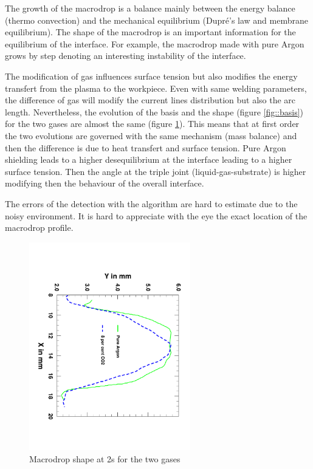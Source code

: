 \documentclass[12pt]{iopart}
\begin{document}
 The growth of the macrodrop is a balance mainly between
the energy balance (thermo convection) and the mechanical equilibrium (Dupr\'e's law and membrane equilibrium). 
The shape of the macrodrop is an important information for
the equilibrium of the interface. 
For example, the macrodrop made with  pure Argon grows by step denoting an interesting instability 
of the interface. 

The modification of gas influences surface tension but also modifies the energy transfert from the plasma
to the workpiece. Even with same welding parameters, 
the difference of gas will modify the current lines distribution but also the arc length.
Nevertheless, the evolution of the basis and the  shape 
(figure \ref{fig::basis}) for the two gases are almost the same (figure \ref{fig::comp_gazs}).
 This means that at first order the two evolutions
are governed with the same mechanism (mass balance) and then the difference is due to heat transfert and surface tension.
Pure Argon shielding leads to a higher desequilibrium at the interface leading to a higher surface tension. Then the angle
at the triple joint (liquid-gas-substrate) is higher modifying then the behaviour of the overall interface.

The errors of the detection with the algorithm are hard to estimate due to the noisy environment. It is hard
to appreciate with the eye the exact location of the macrodrop profile.

\begin{figure}[h!]
\centering    
\includegraphics[width=7cm,angle=90]{images/Comparaison_gazs_2s.pdf}
\caption{Macrodrop shape at 2s for the two gases}
\label{fig::comp_gazs}
\end{figure}
\end{document}
